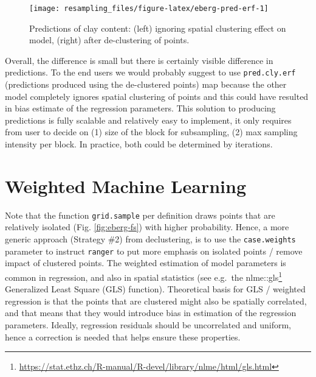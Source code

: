 \documentclass[
  graybox,natbib,nospthms]{svmono}
\newenvironment{Shaded}{\begin{snugshade}}{\end{snugshade}}
\newcommand{\AttributeTok}[1]{\textcolor[rgb]{0.61,0.61,0.61}{#1}}
\newcommand{\CommentTok}[1]{\textcolor[rgb]{0.37,0.37,0.37}{\textit{#1}}}
\newcommand{\DecValTok}[1]{\textcolor[rgb]{0.06,0.06,0.06}{#1}}
\newcommand{\FunctionTok}[1]{\textcolor[rgb]{0,0,0}{#1}}
\newcommand{\NormalTok}[1]{#1}
\newcommand{\StringTok}[1]{\textcolor[rgb]{0.5,0.5,0.5}{#1}}
\renewcommand{\href}[2]{#2 (\url{#1})}
\renewcommand{\href}[2]{#2\footnote{\url{#1}}}
\begin{document}
\begin{Shaded}
\end{Shaded}

\begin{figure}

{\centering \texttt{[image: resampling\_files/figure-latex/eberg-pred-erf-1]} 

}

\caption{Predictions of clay content: (left) ignoring spatial clustering effect on model, (right) after de-clustering of points.}\label{fig:eberg-pred-erf}
\end{figure}

Overall, the difference is small but there is certainly visible difference in predictions.
To the end users we would probably suggest to use \texttt{pred.cly.erf} (predictions produced
using the de-clustered points) map because the other model completely ignores
spatial clustering of points and this could have resulted in bias estimate of the
regression parameters. This solution to producing predictions is fully scalable
and relatively easy to implement, it only requires from user to decide on (1)
size of the block for subsampling, (2) max sampling intensity per block. In practice,
both could be determined by iterations.

\hypertarget{weighted-machine-learning}{%
\section{Weighted Machine Learning}\label{weighted-machine-learning}}

Note that the function \texttt{grid.sample} per definition draws points that are relatively
isolated (Fig. \ref{fig:eberg-fs}) with higher probability. Hence, a more generic
approach (Strategy \#2) from declustering, is to use the \texttt{case.weights} parameter
to instruct \texttt{ranger} to put more emphasis on isolated points / remove impact of
clustered points. The weighted estimation of model parameters is common in regression,
and also in spatial statistics (see e.g.~the \href{https://stat.ethz.ch/R-manual/R-devel/library/nlme/html/gls.html}{nlme::gls} Generalized Least Square (GLS) function).
Theoretical basis for GLS / weighted regression is that the points that are clustered
might also be spatially correlated, and that means that they would introduce bias in
estimation of the regression parameters. Ideally, regression residuals should be
uncorrelated and uniform, hence a correction is needed that helps ensure these properties.
\end{document}
